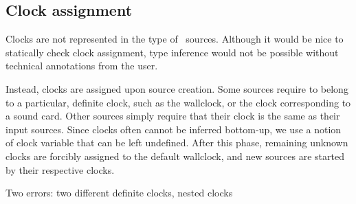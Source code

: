 
\subsection{Clock assignment}

Clocks are not represented in the type of \liquidsoap\ sources.
Although it would be nice to statically check clock assignment,
type inference would not be possible without technical annotations
from the user.

Instead, clocks are assigned upon source creation.
Some sources require to belong to a particular, definite clock,
such as the wallclock, or the clock corresponding to a sound card.
Other sources simply require that their clock is the same as their
input sources.
Since clocks often cannot be inferred bottom-up, we use a notion
of clock variable that can be left undefined.
After this phase, remaining unknown clocks are forcibly assigned
to the default wallclock, and new sources are started by their
respective clocks.

Two errors: two different definite clocks, nested clocks
